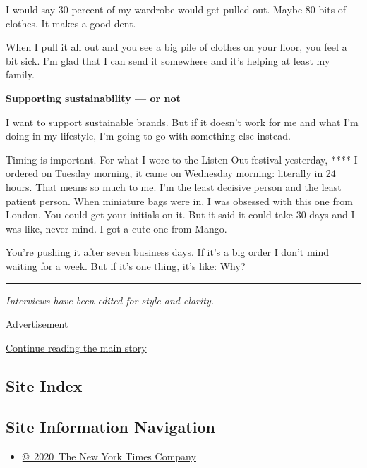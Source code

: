 I would say 30 percent of my wardrobe would get pulled out. Maybe 80
bits of clothes. It makes a good dent.

When I pull it all out and you see a big pile of clothes on your floor,
you feel a bit sick. I'm glad that I can send it somewhere and it's
helping at least my family.

\textbf{Supporting sustainability --- or not}

I want to support sustainable brands. But if it doesn't work for me and
what I'm doing in my lifestyle, I'm going to go with something else
instead.

Timing is important. For what I wore to the Listen Out festival
yesterday, **** I ordered on Tuesday morning, it came on Wednesday
morning: literally in 24 hours. That means so much to me. I'm the least
decisive person and the least patient person. When miniature bags were
in, I was obsessed with this one from London. You could get your
initials on it. But it said it could take 30 days and I was like, never
mind. I got a cute one from Mango.

You're pushing it after seven business days. If it's a big order I don't
mind waiting for a week. But if it's one thing, it's like: Why?

\begin{center}\rule{0.5\linewidth}{\linethickness}\end{center}

\emph{Interviews have been edited for style and clarity.}

Advertisement

\protect\hyperlink{after-bottom}{Continue reading the main story}

\hypertarget{site-index}{%
\subsection{Site Index}\label{site-index}}

\hypertarget{site-information-navigation}{%
\subsection{Site Information
Navigation}\label{site-information-navigation}}

\begin{itemize}
\tightlist
\item
  \href{https://help.nytimes3xbfgragh.onion/hc/en-us/articles/115014792127-Copyright-notice}{©~2020~The
  New York Times Company}
\end{itemize}

